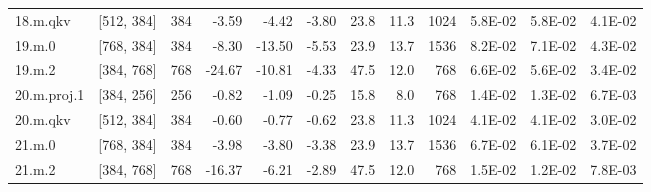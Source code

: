 \begin{table}
\begin{tabular}{llrrrrrrrrrr}
18.m.qkv & [512, 384] & 384 & {\cellcolor[HTML]{F4FAB0}} \color[HTML]{000000} -3.59 & {\cellcolor[HTML]{F5FBB2}} \color[HTML]{000000} -4.42 & {\cellcolor[HTML]{F4FAB0}} \color[HTML]{000000} -3.80 & 23.8 & 11.3 & 1024 & {\cellcolor[HTML]{FFFCBA}} \color[HTML]{000000} 5.8E-02 & {\cellcolor[HTML]{FFFCBA}} \color[HTML]{000000} 5.8E-02 & {\cellcolor[HTML]{ECF7A6}} \color[HTML]{000000} 4.1E-02 \\
19.m.0 & [768, 384] & 384 & {\cellcolor[HTML]{FFFDBC}} \color[HTML]{000000} -8.30 & {\cellcolor[HTML]{FFF2AA}} \color[HTML]{000000} -13.50 & {\cellcolor[HTML]{F8FCB6}} \color[HTML]{000000} -5.53 & 23.9 & 13.7 & 1536 & {\cellcolor[HTML]{FEE491}} \color[HTML]{000000} 8.2E-02 & {\cellcolor[HTML]{FEEFA3}} \color[HTML]{000000} 7.1E-02 & {\cellcolor[HTML]{EEF8A8}} \color[HTML]{000000} 4.3E-02 \\
19.m.2 & [384, 768] & 768 & {\cellcolor[HTML]{FED481}} \color[HTML]{000000} -24.67 & {\cellcolor[HTML]{FFF8B4}} \color[HTML]{000000} -10.81 & {\cellcolor[HTML]{F5FBB2}} \color[HTML]{000000} -4.33 & 47.5 & 12.0 & 768 & {\cellcolor[HTML]{FFF3AC}} \color[HTML]{000000} 6.6E-02 & {\cellcolor[HTML]{FFFEBE}} \color[HTML]{000000} 5.6E-02 & {\cellcolor[HTML]{E3F399}} \color[HTML]{000000} 3.4E-02 \\
20.m.proj.1 & [384, 256] & 256 & {\cellcolor[HTML]{ECF7A6}} \color[HTML]{000000} -0.82 & {\cellcolor[HTML]{ECF7A6}} \color[HTML]{000000} -1.09 & {\cellcolor[HTML]{EBF7A3}} \color[HTML]{000000} -0.25 & 15.8 & 8.0 & 768 & {\cellcolor[HTML]{C3E67D}} \color[HTML]{000000} 1.4E-02 & {\cellcolor[HTML]{C3E67D}} \color[HTML]{000000} 1.3E-02 & {\cellcolor[HTML]{B7E075}} \color[HTML]{000000} 6.7E-03 \\
20.m.qkv & [512, 384] & 384 & {\cellcolor[HTML]{EBF7A3}} \color[HTML]{000000} -0.60 & {\cellcolor[HTML]{ECF7A6}} \color[HTML]{000000} -0.77 & {\cellcolor[HTML]{EBF7A3}} \color[HTML]{000000} -0.62 & 23.8 & 11.3 & 1024 & {\cellcolor[HTML]{ECF7A6}} \color[HTML]{000000} 4.1E-02 & {\cellcolor[HTML]{ECF7A6}} \color[HTML]{000000} 4.1E-02 & {\cellcolor[HTML]{DDF191}} \color[HTML]{000000} 3.0E-02 \\
21.m.0 & [768, 384] & 384 & {\cellcolor[HTML]{F5FBB2}} \color[HTML]{000000} -3.98 & {\cellcolor[HTML]{F4FAB0}} \color[HTML]{000000} -3.80 & {\cellcolor[HTML]{F2FAAE}} \color[HTML]{000000} -3.38 & 23.9 & 13.7 & 1536 & {\cellcolor[HTML]{FFF2AA}} \color[HTML]{000000} 6.7E-02 & {\cellcolor[HTML]{FFFAB6}} \color[HTML]{000000} 6.1E-02 & {\cellcolor[HTML]{E8F59F}} \color[HTML]{000000} 3.7E-02 \\
21.m.2 & [384, 768] & 768 & {\cellcolor[HTML]{FEEB9D}} \color[HTML]{000000} -16.37 & {\cellcolor[HTML]{FBFDBA}} \color[HTML]{000000} -6.21 & {\cellcolor[HTML]{F1F9AC}} \color[HTML]{000000} -2.89 & 47.5 & 12.0 & 768 & {\cellcolor[HTML]{C5E67E}} \color[HTML]{000000} 1.5E-02 & {\cellcolor[HTML]{BFE47A}} \color[HTML]{000000} 1.2E-02 & {\cellcolor[HTML]{B9E176}} \color[HTML]{000000} 7.8E-03 \\

\bottomrule
\end{tabular}
\end{table}

